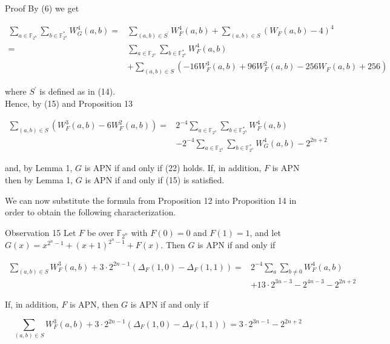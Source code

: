 \documentclass[10pt]{article}
\begin{document}
Proof By (6) we get

$$
\begin{aligned}
\sum_{a \in \mathbb{F}_{2^{n}}} \sum_{b \in \mathbb{F}_{2^{n}}^{*}} W_{G}^{4}(a, b)= & \sum_{(a, b) \in S^{\prime}} W_{F}^{4}(a, b)+\sum_{(a, b) \in S}\left(W_{F}(a, b)-4\right)^{4} \\
= & \sum_{a \in \mathbb{F}_{2^{n}}} \sum_{b \in \mathbb{F}_{2^{n}}^{*}} W_{F}^{4}(a, b) \\
& +\sum_{(a, b) \in S}\left(-16 W_{F}^{3}(a, b)+96 W_{F}^{2}(a, b)-256 W_{F}(a, b)+256\right)
\end{aligned}
$$

where $S^{\prime}$ is defined as in (14).\\
Hence, by (15) and Proposition 13

$$
\begin{aligned}
\sum_{(a, b) \in S}\left(W_{F}^{3}(a, b)-6 W_{F}^{2}(a, b)\right)= & 2^{-4} \sum_{a \in \mathbb{F}_{2^{n}}} \sum_{b \in \mathbb{F}_{2^{n}}^{*}} W_{F}^{4}(a, b) \\
& -2^{-4} \sum_{a \in \mathbb{F}_{2^{n}}} \sum_{b \in \mathbb{F}_{2^{n}}^{*}} W_{G}^{4}(a, b)-2^{2 n+2}
\end{aligned}
$$

and, by Lemma 1, $G$ is APN if and only if (22) holds. If, in addition, $F$ is APN then by Lemma 1, $G$ is APN if and only if (15) is satisfied.

We can now substitute the formula from Proposition 12 into Proposition 14 in order to obtain the following characterization.

Observation 15 Let $F$ be over $\mathbb{F}_{2^{n}}$ with $F(0)=0$ and $F(1)=1$, and let $G(x)=x^{2^{n}-1}+ (x+1)^{2^{n}-1}+F(x)$. Then $G$ is APN if and only if


\begin{align*}
\sum_{(a, b) \in S} W_{F}^{3}(a, b)+3 \cdot 2^{2 n-1}\left(\Delta_{F}(1,0)-\Delta_{F}(1,1)\right)= & 2^{-4} \sum_{a} \sum_{b \neq 0} W_{F}^{4}(a, b) \\
& +13 \cdot 2^{3 n-3}-2^{4 n-3}-2^{2 n+2} \tag{24}
\end{align*}


If, in addition, $F$ is APN, then $G$ is APN if and only if


\begin{equation*}
\sum_{(a, b) \in S} W_{F}^{3}(a, b)+3 \cdot 2^{2 n-1}\left(\Delta_{F}(1,0)-\Delta_{F}(1,1)\right)=3 \cdot 2^{3 n-1}-2^{2 n+2} \tag{25}
\end{equation*}
\end{document}

